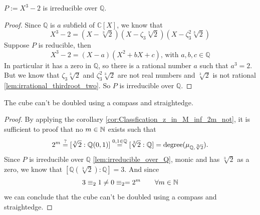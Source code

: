 \begin{lemma}
    $P := X^3 - 2$ is irreducible over $\mathbb{Q}$.
\label{lem:irreducible_over_Q}
\leanok
{}
\end{lemma}
\begin{proof}
    \leanok
    Since $\mathbb{Q}$ is $a$ subfield of $\mathbb{C} [X]$, we know that
    \begin{equation*}
        X^3 - 2 = (X - \sqrt[3]{2})(X -\zeta_3 \sqrt[3]{2})(X -\zeta_3^2 \sqrt[3]{2})
    \end{equation*}
    Suppose $P$ is reducible, then
    \begin{equation*}
        X^3 - 2 = (X - a)(X^2 + bX + c)\text{, with } a, b, c \in \mathbb{Q}
    \end{equation*}
    In particular it has a zero in $\mathbb{Q}$, so there is a rational number $a$ such that $a^3 = 2$.\newline
    But we know that $\zeta_3 \sqrt[3]{2}$ and $\zeta_3^2 \sqrt[3]{2}$ are not real numbers and $\sqrt[3]{2}$ is not rational \ref{lem:irrational_thirdroot_two}.
    So $P$ is irreducible over $\mathbb{Q}$.
\end{proof}

\begin{theorem}
    \label{thm:third_root_of_two_not_in_M_inf}
    \leanok
    The cube can't be doubled using a compass and straightedge.
\end{theorem}
\begin{proof}
    \leanok
    By applying the corollary \ref{cor:Classfication_z_in_M_inf_2m_not}, it is sufficient to proof that no $m\in \mathbb{N}$ exists such that
    $$2^m\overset{?}{=}[\sqrt[3]{2}:\mathbb{Q}({0,1})]\overset{0,1\in\mathbb{Q}}{=} [\sqrt[3]{2}:\mathbb{Q}] = \text{degree}(\mu_{\mathbb{Q},\sqrt[3]{2}}).$$
    Since $P$ is irreducible over $\mathbb{Q}$ \ref{lem:irreducible_over_Q}, monic and has $\sqrt[3]{2}$ as a zero, we know that $[\mathbb{Q}(\sqrt[3]{2}):\mathbb{Q}] = 3$.
    And since $$ 3  \equiv_2 1 \neq 0  \equiv_2 = 2^m \qquad\forall m \in \mathbb{N}$$
    we can conclude that the cube can't be doubled using a compass and straightedge.
    
\end{proof}

